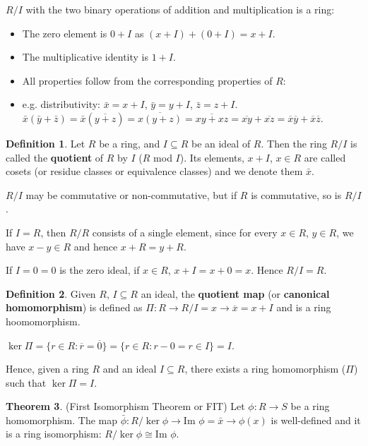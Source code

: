 \documentclass[12pt,a4paper]{article}
\theoremstyle{definition}
\newtheorem{definition}{Definition}[subsection]
\newtheorem{theorem}[definition]{Theorem}
\begin{document}
$R / I$ with the two binary operations of addition and multiplication is a ring:
\begin{itemize}
	\item The zero element is $0 + I$ as $(x + I) + (0 + I) = x + I$.
	\item The multiplicative identity is $1 + I$.
	\item All properties follow from the corresponding properties of $R$:
	\item e.g. distributivity: $\bar{x} = x + I$, $\bar{y} = y + I$, $\bar{z} = z + I$.
	$\bar{x}(\bar{y} + \bar{z}) = \bar{x}(\overline{y + z}) = \overline{x(y + z)} = \overline{xy + xz} = \overline{xy} + \overline{xz} = \overline{x}\overline{y} + \overline{x}\overline{z}$.
\end{itemize}

\begin{definition}
	Let $R$ be a ring, and $I \subseteq R$ be an ideal of $R$. Then the ring $R / I$ is called the \textbf{quotient} of $R$ by $I$ ($R$ mod $I$). Its elements, $x + I$, $x \in R$ are called cosets (or residue classes or equivalence classes) and we denote them $\bar{x}$.
	
	$R / I$ may be commutative or non-commutative, but if $R$ is commutative, so is $R / I$.

	If $I = R$, then $R / R$ consists of a single element, since for every $x \in R$, $y \in R$, we have $x - y \in R$ and hence $x + R = y + R$.

	If $I = 0 = {0}$ is the zero ideal, if $x \in R$, $x + I = x + 0 = x$. Hence $R / I = R$.
\end{definition}

\begin{definition}
	Given $R$, $I \subseteq R$ an ideal, the \textbf{quotient map} (or \textbf{canonical homomorphism}) is defined as $\Pi: R \rightarrow R / I = x \rightarrow \overline{x} = x + I$ and is a ring hoomomorphism.

	$\ker \Pi = \{r \in R: \overline{r} = \overline{0}\} = \{r \in R: r - 0 = r \in I\} = I$.
\end{definition}

Hence, given a ring $R$ and an ideal $I \subseteq R$, there exists a ring homomorphism ($\Pi$) such that $\ker \Pi = I$.

\begin{theorem}
	(First Isomorphism Theorem or FIT) Let $\phi: R \rightarrow S$ be a ring homomorphism. The map $\bar{\phi}: R / \ker \phi \rightarrow \text{Im } \phi = \bar{x} \rightarrow \phi(x)$ is well-defined and it is a ring isomorphism: $R / \ker \phi \cong \text{Im } \phi$.
\end{theorem}
\end{document}
